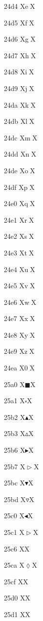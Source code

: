 \documentclass[11pt]{article}
\begin{document}
24d4 X{\textcircled{e}}X

24d5 X{\textcircled{f}}X

24d6 X{\textcircled{g}}X

24d7 X{\textcircled{h}}X

24d8 X{\textcircled{i}}X

24d9 X{\textcircled{j}}X

24da X{\textcircled{k}}X

24db X{\textcircled{l}}X

24dc X{\textcircled{m}}X

24dd X{\textcircled{n}}X

24de X{\textcircled{o}}X

24df X{\textcircled{p}}X

24e0 X{\textcircled{q}}X

24e1 X{\textcircled{r}}X

24e2 X{\textcircled{s}}X

24e3 X{\textcircled{t}}X

24e4 X{\textcircled{u}}X

24e5 X{\textcircled{v}}X

24e6 X{\textcircled{w}}X

24e7 X{\textcircled{x}}X

24e8 X{\textcircled{y}}X

24e9 X{\textcircled{z}}X

24ea X{\textcircled{0}}X

25a0 X{\ensuremath{\blacksquare}}X

25a1 X{\ensuremath{\square}}X

25b2 X{\ensuremath{\blacktriangle}}X

25b3 X{\ensuremath{\vartriangle}}X

25b6 X{\ensuremath{\blacktriangleright}}X

25b7 X{\ensuremath{\vartriangleright}}X

25bc X{\ensuremath{\blacktriangledown}}X

25bd X{\ensuremath{\triangledown}}X

25c0 X{\ensuremath{\blacktriangleleft}}X

25c1 X{\ensuremath{\vartriangleright}}X

25c6 X{}X

25ca X{\ensuremath{\lozenge}}X

25cf X{\CIRCLE}X

25d0 X{\LEFTcircle}X

25d1 X{\RIGHTcircle}X
\end{document}
